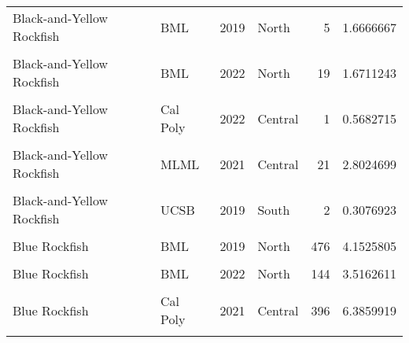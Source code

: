 \documentclass[
]{article}
\begin{document}
\begin{longtable}[t]{llrlrr}
Black-and-Yellow Rockfish & BML & 2019 & North & 5 & 1.6666667\\
\cellcolor{gray!6}{Black-and-Yellow Rockfish} & \cellcolor{gray!6}{BML} & \cellcolor{gray!6}{2021} & \cellcolor{gray!6}{North} & \cellcolor{gray!6}{21} & \cellcolor{gray!6}{2.8042328}\\
\addlinespace
Black-and-Yellow Rockfish & BML & 2022 & North & 19 & 1.6711243\\
\cellcolor{gray!6}{Black-and-Yellow Rockfish} & \cellcolor{gray!6}{Cal Poly} & \cellcolor{gray!6}{2021} & \cellcolor{gray!6}{Central} & \cellcolor{gray!6}{1} & \cellcolor{gray!6}{0.6666667}\\
Black-and-Yellow Rockfish & Cal Poly & 2022 & Central & 1 & 0.5682715\\
\cellcolor{gray!6}{Black-and-Yellow Rockfish} & \cellcolor{gray!6}{MLML} & \cellcolor{gray!6}{2019} & \cellcolor{gray!6}{Central} & \cellcolor{gray!6}{3} & \cellcolor{gray!6}{0.5980114}\\
Black-and-Yellow Rockfish & MLML & 2021 & Central & 21 & 2.8024699\\
\addlinespace
\cellcolor{gray!6}{Black-and-Yellow Rockfish} & \cellcolor{gray!6}{MLML} & \cellcolor{gray!6}{2022} & \cellcolor{gray!6}{Central} & \cellcolor{gray!6}{2} & \cellcolor{gray!6}{0.3329638}\\
Black-and-Yellow Rockfish & UCSB & 2019 & South & 2 & 0.3076923\\
\cellcolor{gray!6}{Black-and-Yellow Rockfish} & \cellcolor{gray!6}{UCSB} & \cellcolor{gray!6}{2021} & \cellcolor{gray!6}{South} & \cellcolor{gray!6}{1} & \cellcolor{gray!6}{0.4615385}\\
Blue Rockfish & BML & 2019 & North & 476 & 4.1525805\\
\cellcolor{gray!6}{Blue Rockfish} & \cellcolor{gray!6}{BML} & \cellcolor{gray!6}{2021} & \cellcolor{gray!6}{North} & \cellcolor{gray!6}{344} & \cellcolor{gray!6}{3.9604359}\\
\addlinespace
Blue Rockfish & BML & 2022 & North & 144 & 3.5162611\\
\cellcolor{gray!6}{Blue Rockfish} & \cellcolor{gray!6}{Cal Poly} & \cellcolor{gray!6}{2019} & \cellcolor{gray!6}{Central} & \cellcolor{gray!6}{977} & \cellcolor{gray!6}{8.2070904}\\
Blue Rockfish & Cal Poly & 2021 & Central & 396 & 6.3859919\\
\cellcolor{gray!6}{Blue Rockfish} & \cellcolor{gray!6}{Cal Poly} & \cellcolor{gray!6}{2022} & \cellcolor{gray!6}{Central} & \cellcolor{gray!6}{97} & \cellcolor{gray!6}{1.8102338}\\

\end{longtable}
\end{document}
